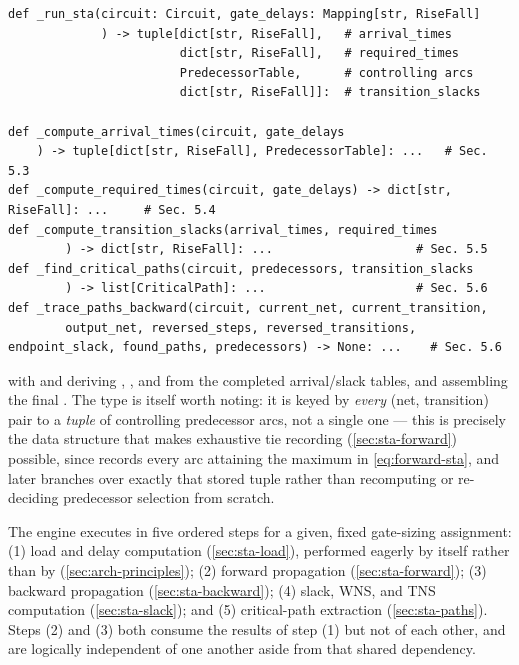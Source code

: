 \begin{lstlisting}[style=pythonstyle, numbers=none]
def _run_sta(circuit: Circuit, gate_delays: Mapping[str, RiseFall]
             ) -> tuple[dict[str, RiseFall],   # arrival_times
                        dict[str, RiseFall],   # required_times
                        PredecessorTable,      # controlling arcs
                        dict[str, RiseFall]]:  # transition_slacks

def _compute_arrival_times(circuit, gate_delays
    ) -> tuple[dict[str, RiseFall], PredecessorTable]: ...   # Sec. 5.3
def _compute_required_times(circuit, gate_delays) -> dict[str, RiseFall]: ...     # Sec. 5.4
def _compute_transition_slacks(arrival_times, required_times
        ) -> dict[str, RiseFall]: ...                    # Sec. 5.5
def _find_critical_paths(circuit, predecessors, transition_slacks
        ) -> list[CriticalPath]: ...                     # Sec. 5.6
def _trace_paths_backward(circuit, current_net, current_transition,
        output_net, reversed_steps, reversed_transitions, endpoint_slack, found_paths, predecessors) -> None: ...    # Sec. 5.6
\end{lstlisting}

with  and 
deriving , , and  from the
completed arrival/slack tables, and  assembling the
final . The type
 is itself worth noting: it is keyed by
\emph{every} (net, transition) pair to a \emph{tuple} of controlling
predecessor arcs, not a single one --- this is precisely the data structure
that makes exhaustive tie recording (\cref{sec:sta-forward}) possible,
since  records every arc attaining the
maximum in \cref{eq:forward-sta}, and 
later branches over exactly that stored tuple rather than recomputing or
re-deciding predecessor selection from scratch.

The engine executes in five ordered steps for a given, fixed gate-sizing
assignment: (1) load and delay computation (\cref{sec:sta-load}), performed
eagerly by  itself rather than by
 (\cref{sec:arch-principles}); (2) forward propagation
(\cref{sec:sta-forward}); (3) backward propagation
(\cref{sec:sta-backward}); (4) slack, WNS, and TNS computation
(\cref{sec:sta-slack}); and (5) critical-path extraction
(\cref{sec:sta-paths}). Steps (2) and (3) both consume the results of step
(1) but not of each other, and are logically independent of one another
aside from that shared dependency.

